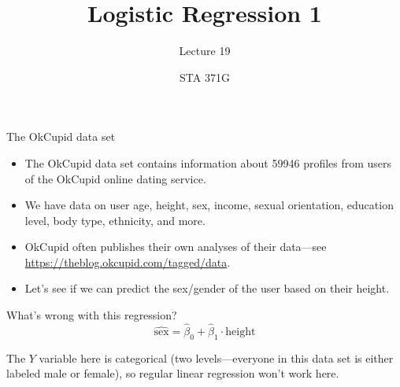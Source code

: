 \documentclass{beamer}\usepackage[]{graphicx}\usepackage[]{color}
\title{Logistic Regression 1}
\subtitle{Lecture 19}
\author{STA 371G}
\begin{document}
  
  

  \frame{\maketitle}



  \begin{darkframes}
    \begin{frame}
    \end{frame}

    \begin{frame}{The OkCupid data set}
      \begin{itemize}
        \item The OkCupid data set contains information about 59946 profiles from users of the OkCupid online dating service.
        \item We have data on user age, height, sex, income, sexual orientation, education level, body type, ethnicity, and more.
        \item OkCupid often publishes their own analyses of their data---see \url{https://theblog.okcupid.com/tagged/data}.
        \item Let's see if we can predict the sex/gender of the user based on their height.
      \end{itemize}
    \end{frame}

    \begin{frame}{What's wrong with this regression?}
      \[
        \widehat{\text{sex}} = \hat\beta_0 + \hat\beta_1\cdot\text{height}
      \]

      \pause

      \begin{center}
        The $Y$ variable here is \alert{categorical} (two levels---everyone in this data set is either labeled male or female), so regular linear regression won't work here.
      \end{center}
    \end{frame}


\end{darkframes}
\end{document}
